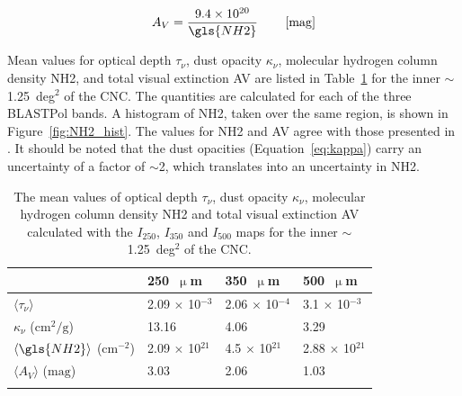 \begin{equation}\label{eq:Av}
A_{V} = \frac{ 9.4 \times 10^{20}}{\gls{NH2}} \qquad \left[ \mathrm{mag} \right]
\end{equation}

Mean values for optical depth $\tau_{\nu}$, dust opacity $\kappa_{\nu}$, molecular hydrogen column density \gls{NH2}, and total visual extinction \gls{AV} are listed in Table~\ref{table:NH2_fit} for the inner $\sim$1.25~deg$^{2}$ of the CNC\@. The quantities are calculated for each of the three BLASTPol bands. A histogram of \gls{NH2}, taken over the same region, is shown in Figure~\ref{fig:NH2_hist}. The values for \gls{NH2} and \gls{AV} agree with those presented in \citet{preibisch2012herschel}. It should be noted that the dust opacities (Equation~\ref{eq:kappa}) carry an uncertainty of a factor of $\sim$2, which translates into an uncertainty in \gls{NH2}.


\begin{table}[!htbp]
  \centering
\begin{tabular}{@{}llll@{}}
\dtoprule{}
      & 250~$\upmu$m                              & 350~$\upmu$m       & 500~$\upmu$m              \\ \midrule
$\langle \tau_{\nu}  \rangle$  & 2.09 $\times$ 10$^{-3}$ & 2.06 $\times$ 10$^{-4}$ & 3.1 $\times$ 10$^{-3}$  \\
$\kappa_{\nu}$ ($\mathrm{cm}^{2}/\mathrm{g}$)    & 13.16             & 4.06     & 3.29                    \\
$\langle \gls{NH2}  \rangle$  ($\mathrm{cm}^{-2}$) & 2.09 $\times$ 10$^{21}$                 & 4.5 $\times$ 10$^{21}$                 & 2.88 $\times$ 10$^{21}$ \\
$\langle A_{V} \rangle$  ($\mathrm{mag}$)                              & 3.03                   & 2.06                   & 1.03                    \\ \dbottomrule{}
\\
\end{tabular}
\centering
\caption[Estimated map parameters calculated using total intensity maps over the inner  of the CNC.]{The mean values of optical depth $\tau_{\nu}$, dust opacity $\kappa_{\nu}$, molecular hydrogen column density \gls{NH2} and total visual extinction \gls{AV} calculated with the $I_{250}$, $I_{350}$ and $I_{500}$ maps for the inner $\sim$1.25~deg$^{2}$ of the CNC.}
\label{table:NH2_fit}
\end{table}

